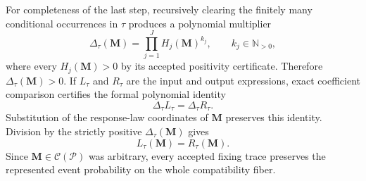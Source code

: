 For completeness of the last step, recursively clearing the finitely many conditional occurrences in \(\tau\) produces a polynomial multiplier
\[
 \Delta_\tau(\mathbf M)=\prod_{j=1}^{J}H_j(\mathbf M)^{k_j},
 \qquad k_j\in\mathbb N_{>0},
\]
where every \(H_j(\mathbf M)>0\) by its accepted positivity certificate.  Therefore \(\Delta_\tau(\mathbf M)>0\).  If \(L_\tau\) and \(R_\tau\) are the input and output expressions, exact coefficient comparison certifies the formal polynomial identity
\[
 \Delta_\tau L_\tau=\Delta_\tau R_\tau.
\]
Substitution of the response-law coordinates of \(\mathbf M\) preserves this identity.  Division by the strictly positive \(\Delta_\tau(\mathbf M)\) gives
\[
 L_\tau(\mathbf M)=R_\tau(\mathbf M).
\]
Since \(\mathbf M\in\mathcal C(\mathcal P)\) was arbitrary, every accepted fixing trace preserves the represented event probability on the whole compatibility fiber.